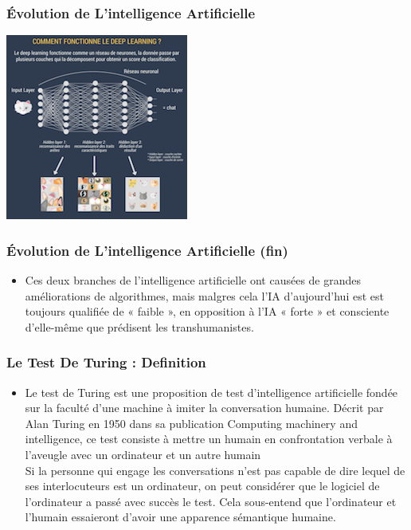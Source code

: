 \documentclass{beamer}
\begin{document}
	\begin{frame}[fragile]
	\frametitle{Évolution de L'intelligence  Artificielle}
	
	\centerline{\includegraphics{deeplearning.png}}%
	
	\end{frame}
	
	\begin{frame}[fragile]
		\frametitle{Évolution de L'intelligence  Artificielle (fin)}
		\begin{itemize}
		\item Ces deux branches de l'intelligence artificielle ont causées de grandes améliorations de 						algorithmes, mais malgres cela l'IA d'aujourd'hui est est toujours qualifiée de « faible », en opposition 			à l’IA « forte » et consciente d’elle-même que prédisent les transhumanistes.

	\end{itemize}
	\end{frame}
	
	\begin{frame}[fragile]
		\frametitle{Le Test De Turing : Definition}
		\begin{itemize}
		 \item Le test de Turing est une proposition de test d’intelligence artificielle fondée sur la faculté d'une machine à imiter la conversation humaine. Décrit par Alan Turing en 1950 dans sa publication Computing machinery and intelligence, ce test consiste à mettre un humain en confrontation verbale à l’aveugle avec un ordinateur et un autre humain \\
		 Si la personne qui engage les conversations n’est pas capable de dire lequel de ses interlocuteurs est un ordinateur, on peut considérer que le logiciel de l’ordinateur a passé avec succès le test. Cela sous-entend que l’ordinateur et l’humain essaieront d’avoir une apparence sémantique humaine.
		
		\end{itemize}
		\end{frame}
		
\end{document}

